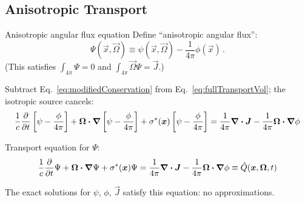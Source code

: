 \documentclass{beamer}
\begin{document}
\subsection{Anisotropic Transport}
\begin{frame}{Anisotropic angular flux equation}
  Define ``anisotropic angular flux'':
  \begin{equation} \label{eq:capPsi}
    \Psi(\vec{x}, \vec{\Omega}) \equiv \psi(\vec{x}, \vec{\Omega})
    - \frac{1}{4\pi} \phi(\vec{x})\,.
  \end{equation}
  (This satisfies $\int_{4\pi} \Psi=0$ and $\int_{4\pi} \vec{\Omega} \Psi =
  \vec{J}$.)

  Subtract Eq.~\eqref{eq:modifiedConservation} from
  Eq.~\eqref{eq:fullTransportVol}; the isotropic source cancels:
\begin{multline*}
  \frac{1}{c} \frac{\partial }{\partial t} \left[ \psi - \frac{\phi}{4\pi} \right]
    + \bm{\Omega}\bm{\cdot} \bm{\nabla} \left[ \psi - \frac{\phi}{4\pi} \right]
    + \sigma^\ast(\bm{x})\left[ \psi - \frac{\phi}{4\pi} \right]
  = \frac{1}{4\pi} \bm{\nabla} \bm{\cdot}\bm{J} -
  \frac{1}{4\pi} \bm{\Omega}\bm{\cdot} \bm{\nabla} \phi
\end{multline*}

  Transport equation for $\Psi$:
\begin{equation*}
  \frac{1}{c} \frac{\partial }{\partial t} \Psi
   + \bm{\Omega}\bm{\cdot} \bm{\nabla} \Psi
   + \sigma^\ast(\bm{x}) \Psi
  = \frac{1}{4\pi} \bm{\nabla} \bm{\cdot}\bm{J} -
  \frac{1}{4\pi} \bm{\Omega}\bm{\cdot} \bm{\nabla} \phi
  \equiv \hat Q(\bm{x}, \bm{\Omega}, t)
\end{equation*}

The exact solutions for $\psi$, $\phi$, $\vec{J}$ satisfy this equation: no
approximations.
\end{frame}
\end{document}
